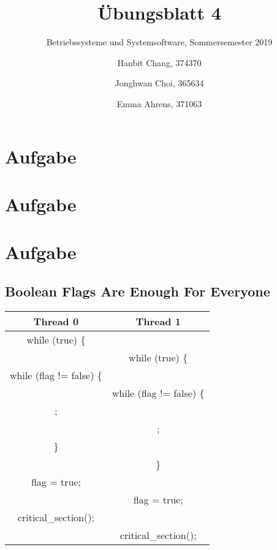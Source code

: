 \documentclass{scrartcl}
\title{Übungsblatt 4}
\subtitle{Betriebssysteme und Systemsoftware, Sommersemester 2019}
\author{ Hanbit Chang, 374370 \and Jonghwan Choi, 365634 \and Emma Ahrens, 371063}
\begin{document}
\maketitle

\section{Aufgabe}


\section{Aufgabe}

\subsection{}

\subsection{}

\section{Aufgabe}

\subsection{Boolean Flags Are Enough For Everyone}

\begin{center}
\begin{tabular}{ c | c }
 Thread 0 & Thread 1 \\ [0.5ex] \hline \hline
 while (true) \{ & \\ \hline
  & while (true) \{ \\ \hline
 while (flag != false) \{ & \\ \hline
  & while (flag != false) \{ \\ \hline
 ; & \\ \hline
  & ; \\ \hline
 \} & \\ \hline
  & \} \\ \hline
 flag = true; & \\ \hline
  & flag = true; \\ \hline
 critical\_section(); & \\ \hline
  & critical\_section(); \\ 
\end{tabular}
\end{center}
\end{document}
